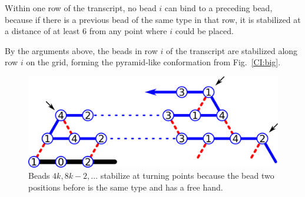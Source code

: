 Within one row of the transcript, no bead $i$ can bind to a preceding bead, because if there is a previous bead of the same type in that row, it is stabilized at a distance of at least $6$ from any point where $i$ could be placed.

By the arguments above, the beads in row $i$ of the transcript are stabilized along row $i$ on the grid, forming the pyramid-like conformation from Fig.~\ref{CI:big}.


\begin{figure}
	\centering
	\includegraphics[width=0.7\linewidth]{./Fig/CI_turnn}
	\caption{Beads $4k, 8k-2, \dots$ stabilize at turning points because the bead two positions before is the same type and has a free hand.}
	\label{CI:turn}
\end{figure}



